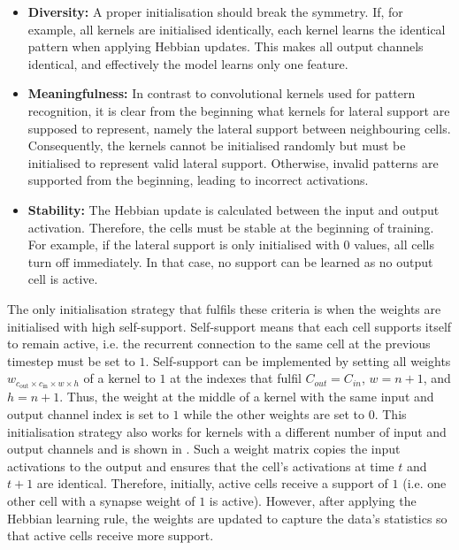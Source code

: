 \begin{itemize}
    \item \textbf{Diversity:} A proper initialisation should break the symmetry. If, for example, all kernels are initialised identically, each kernel learns the identical pattern when applying Hebbian updates. This makes all output channels identical, and effectively the model learns only one feature.
    \item \textbf{Meaningfulness:} In contrast to convolutional kernels used for pattern recognition, it is clear from the beginning what kernels for lateral support are supposed to represent, namely the lateral support between neighbouring cells. Consequently, the kernels cannot be initialised randomly but must be initialised to represent valid lateral support. Otherwise, invalid patterns are supported from the beginning, leading to incorrect activations.
    \item \textbf{Stability:} The Hebbian update is calculated between the input and output activation. Therefore, the cells must be stable at the beginning of training. For example, if the lateral support is only initialised with $0$ values, all cells turn off immediately. In that case, no support can be learned as no output cell is active.
\end{itemize}

The only initialisation strategy that fulfils these criteria is when the weights are initialised with high self-support.
Self-support means that each cell supports itself to remain active, i.e. the recurrent connection to the same cell at the previous timestep must be set to $1$.
Self-support can be implemented by setting all weights $w_{c_{\text{out}} \times c_{\text{in}} \times w \times h}$ of a kernel to $1$ at the indexes that fulfil 
$C_{out} = C_{in}$, $w = n+1$, and $h = n+1$. Thus, the weight at the middle of a kernel with the same input and output channel index is set to $1$ while the other weights are set to $0$. This initialisation strategy also works for kernels with a different number of input and output channels and is shown in .
Such a weight matrix copies the input activations to the output and ensures that the cell's activations at time $t$ and $t+1$ are identical. Therefore, initially, active cells receive a support of $1$ (i.e. one other cell with a synapse weight of $1$ is active).
However, after applying the Hebbian learning rule, the weights are updated to capture the data's statistics so that active cells receive more support.

